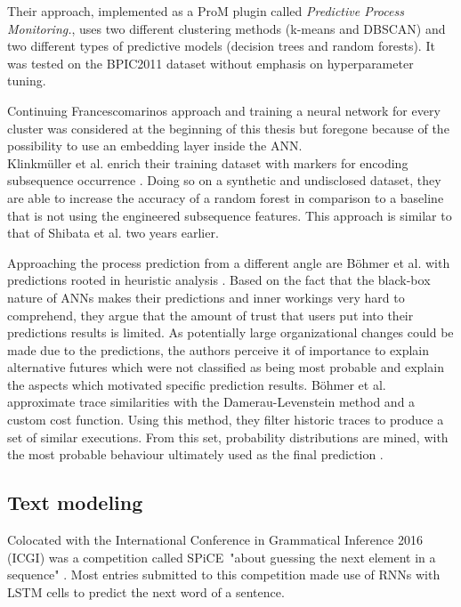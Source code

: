 Their approach, implemented as a ProM plugin called \textit{Predictive Process Monitoring.}, uses two different clustering methods (k-means and DBSCAN) and two different types of predictive models (decision trees and random forests). It was tested on the BPIC2011 dataset \cite{BPIC2011} without emphasis on hyperparameter tuning.

Continuing Francescomarinos approach and training a neural network for every cluster was considered at the beginning of this thesis but foregone because of the possibility to use an embedding layer inside the ANN.\\

Klinkmüller et al. enrich their training dataset with markers for encoding subsequence occurrence \cite{klinkmuller2018reliablemonitoring}. Doing so on a synthetic and undisclosed dataset, they are able to increase the accuracy of a random forest in comparison to a baseline that is not using the engineered subsequence features. This approach is similar to that of Shibata et al. \cite{shibata2016bipartite} two years earlier.

Approaching the process prediction from a different angle are Böhmer et al. with predictions rooted in heuristic analysis \cite{böhmer2018probability}. Based on the fact that the black-box nature of ANNs makes their predictions and inner workings very hard to comprehend, they argue that the amount of trust that users put into their predictions results is limited. As potentially large organizational changes could be made due to the predictions, the authors perceive it of importance to explain alternative futures which were not classiﬁed as being most probable and explain the aspects which motivated speciﬁc prediction results.
Böhmer et al. approximate trace similarities with the Damerau-Levenstein method and a custom cost function. Using this method, they filter historic traces to produce a set of similar executions. From this set, probability distributions are mined, with the most probable behaviour ultimately used as the final prediction \cite{böhmer2018probability}.

\subsection{Text modeling}
Colocated with the International Conference in Grammatical Inference 2016 (ICGI) was a competition called SPiCE\ "about guessing the next element in a sequence" \cite{web:spice}. Most entries submitted to this competition made use of RNNs with LSTM cells to predict the next word of a sentence.


